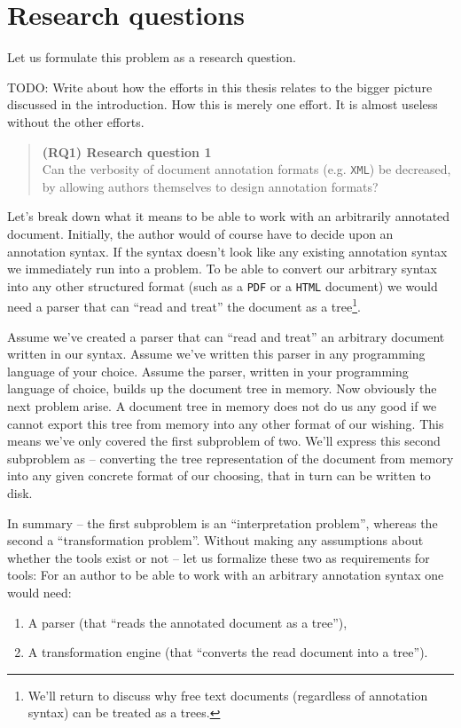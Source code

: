 \documentclass{scrreprt}
\newcommand\researchquestionformat[1]{\begin{quote}#1\end{quote}}
\newcommand\firstresearchquestion{\researchquestionformat{%
  \textbf{(RQ1) Research question 1} \\
  Can the verbosity of document annotation formats (e.g. \texttt{XML}) be decreased, by allowing authors themselves to design annotation formats?%
}}
\begin{document}
\chapter{Research questions}
Let us formulate this problem as a research question.

TODO: Write about how the efforts in this thesis relates to the bigger picture discussed in the introduction. How this is merely one effort. It is almost useless without the other efforts.

\firstresearchquestion

Let's break down what it means to be able to work with an arbitrarily annotated document. Initially, the author would of course have to decide upon an annotation syntax. If the syntax doesn't look like any existing annotation syntax we immediately run into a problem. To be able to convert our arbitrary syntax into any other structured format (such as a \texttt{PDF} or a \texttt{HTML} document) we would need a parser that can ``read and treat'' the document as a tree\footnote{ We'll return to discuss why free text documents (regardless of annotation syntax) can be treated as a trees. }. %

Assume we've created a parser that can ``read and treat'' an arbitrary document written in our syntax. Assume we've written this parser in any programming language of your choice. Assume the parser, written in your programming language of choice, builds up the document tree in memory. Now obviously the next problem arise. A document tree in memory does not do us any good if we cannot export this tree from memory into any other format of our wishing. This means we've only covered the first subproblem of two. We'll express this second subproblem as -- converting the tree representation of the document from memory into any given concrete format of our choosing, that in turn can be written to disk.

In summary -- the first subproblem is an ``interpretation problem'', whereas the second a ``transformation problem''. Without making any assumptions about whether the tools exist or not -- let us formalize these two as requirements for tools: For an author to be able to work with an arbitrary annotation syntax one would need:

\begin{enumerate}
\item A parser (that ``reads the annotated document as a tree''),
\item A transformation engine (that ``converts the read document into a tree'').
\end{enumerate}
\end{document}
